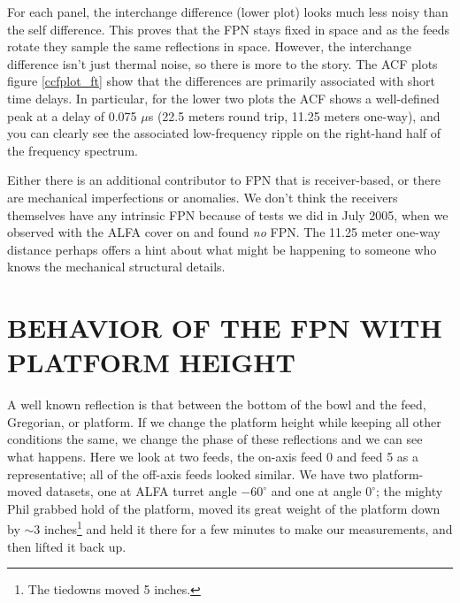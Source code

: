 \documentclass[psfig,preprint]{aastex}
\begin{document}
	For each panel, the interchange difference (lower plot) looks
much less noisy than the self difference.  This proves that the FPN stays
fixed in space and as the feeds rotate they sample the same reflections
in space.  However, the interchange difference isn't just thermal noise,
so there is more to the story.  The ACF plots figure \ref{ccfplot_ft} show that
the differences are primarily associated with short time delays. In
particular, for the lower two plots the ACF shows a well-defined peak at
a delay of 0.075 $\mu$s (22.5 meters round trip, 11.25 meters one-way),
and you can clearly see the associated low-frequency ripple on the
right-hand half of the frequency spectrum. 

	Either there is an additional contributor to FPN that is
receiver-based, or there are mechanical imperfections or anomalies.  We
don't think the receivers themselves have any intrinsic FPN because of
tests we did in July 2005, when we observed with the ALFA cover on and
found {\it no} FPN.  The 11.25 meter one-way distance perhaps offers a
hint about what might be happening to someone who knows the mechanical
structural details. 

\section{BEHAVIOR OF THE FPN WITH PLATFORM HEIGHT}
\label{platform}

	A well known reflection is that between the bottom of the bowl
and the feed, Gregorian, or platform.  If we change the platform height
while keeping all other conditions the same, we change the phase of
these reflections and we can see what happens.  Here we look at two
feeds, the on-axis feed 0 and feed 5 as a representative; all of the
off-axis feeds looked similar.  We have two platform-moved datasets, one
at ALFA turret angle $-60^\circ$ and one at angle $0^\circ$; the mighty
Phil grabbed hold of the platform, moved its great weight of the
platform down by $\sim 3$ inches\footnote{The tiedowns moved 5 inches.}
and held it there for a few minutes to make our measurements, and then
lifted it back up. 
\end{document}

